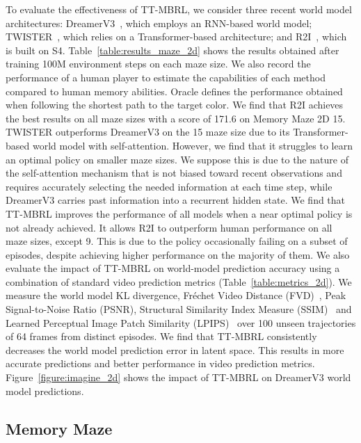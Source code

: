 To evaluate the effectiveness of TT-MBRL, we consider three recent world model architectures: DreamerV3~\citep{hafner2023mastering}, which employs an RNN-based world model; TWISTER~\citep{burchi2025learning}, which relies on a Transformer-based architecture; and R2I~\citep{samsami2024mastering}, which is built on S4. Table~\ref{table:results_maze_2d} shows the results obtained after training 100M environment steps on each maze size. We also record the performance of a human player to estimate the capabilities of each method compared to human memory abilities. Oracle defines the performance obtained when following the shortest path to the target color. We find that R2I achieves the best results on all maze sizes with a score of 171.6 on Memory Maze 2D 15. TWISTER outperforms DreamerV3 on the 15 maze size due to its Transformer-based world model with self-attention. However, we find that it struggles to learn an optimal policy on smaller maze sizes. We suppose this is due to the nature of the self-attention mechanism that is not biased toward recent observations and requires accurately selecting the needed information at each time step, while DreamerV3 carries past information into a recurrent hidden state. We find that TT-MBRL improves the performance of all models when a near optimal policy is not already achieved. It allows R2I to outperform human performance on all maze sizes, except 9. This is due to the policy occasionally failing on a subset of episodes, despite achieving higher performance on the majority of them. We also evaluate the impact of TT-MBRL on world-model prediction accuracy using a combination of standard video prediction metrics (Table~\ref{table:metrics_2d}).  We measure the world model KL divergence, Fréchet Video Distance (FVD)~\citep{unterthiner2018towards}, Peak Signal-to-Noise Ratio (PSNR), Structural Similarity Index Measure (SSIM)~\citep{wang2004image} and Learned Perceptual Image Patch Similarity (LPIPS)~\citep{zhang2018unreasonable} over 100 unseen trajectories of 64 frames from distinct episodes. We find that TT-MBRL consistently decreases the world model prediction error in latent space. This results in more accurate predictions and better performance in video prediction metrics. Figure~\ref{figure:imagine_2d} shows the impact of TT-MBRL on DreamerV3 world model predictions.

\subsection{Memory Maze}
\label{subsection:memory_maze}

